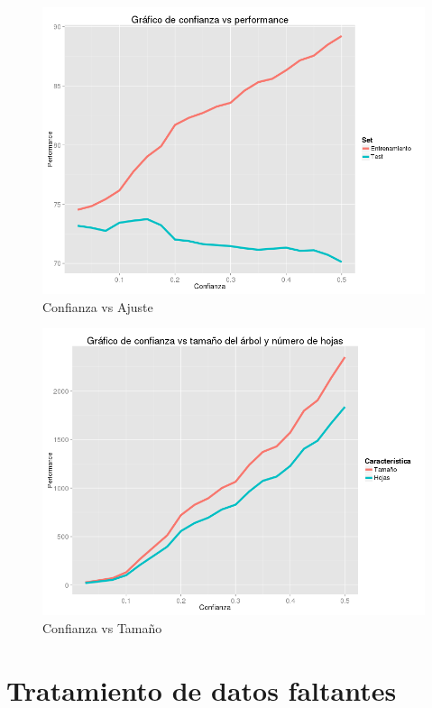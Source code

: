 \documentclass[]{article}
\begin{document}
\begin{figure}
	\includegraphics[scale = 0.4]{Punto_1_Confianza_VS_ajuste}
	\caption[Confianza vs ajuste]{Confianza vs Ajuste}
	\label{P1ConfVSAjus}
\end{figure}

\begin{figure}
	\includegraphics[scale = 0.4]{Punto_1_Confianza_VS_tamano}
	\caption[Confianza vs ajuste]{Confianza vs Tamaño}
	\label{P1ConfVSTamano}
\end{figure}





\section{Tratamiento de datos faltantes}
\end{document}
